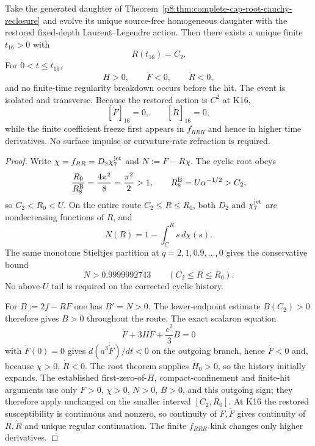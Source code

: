 \documentclass[12pt,a4paper]{article}
\begin{document}
\begin{theorem}
\label{p8:thm:v2111-cyclic-k16-finite-arrival}
Take the generated daughter of
Theorem~\ref{p8:thm:complete-cap-root-cauchy-reclosure} and evolve its unique
source-free homogeneous daughter with the restored fixed-depth Laurent--Legendre
action.  Then there exists a unique finite $t_{16}>0$ with
\[
 \boxed{R(t_{16})=C_2}.
\]
For $0<t\le t_{16}$,
\[
 \boxed{H>0,\qquad \dot F<0,\qquad \dot R<0},
\]
and no finite-time regularity breakdown occurs before the hit.  The event is
isolated and transverse.  Because the restored action is $C^2$ at K16,
\[
 \boxed{[\dot F]_{16}=0,\qquad [\dot R]_{16}=0,}
\]
while the finite coefficient freeze first appears in $f_{RRR}$ and hence in
higher time derivatives.  No surface impulse or curvature-rate refraction is
required.
\end{theorem}
\begin{proof}
Write \(\chi=f_{RR}=D_2\chi_7^{\rm jet}\) and
\(N:=F-R\chi\).  The cyclic root obeys
\[
 \frac{R_0}{R_8^{\rm B}}=\frac{4\pi^2}{8}=\frac{\pi^2}{2}>1,
 \qquad R_8^{\rm B}=U\alpha^{-1/2}>C_2,
\]
so \(C_2<R_0<U\).  On the entire route \(C_2\le R\le R_0\), both \(D_2\) and
\(\chi_7^{\rm jet}\) are nondecreasing functions of \(R\), and
\[
 N(R)=1-\int_C^R s\,d\chi(s).
\]
The same monotone Stieltjes partition at
\(q=2,1,0.9,\ldots,0\) gives the conservative bound
\begin{equation}
\label{p8:eq:v2113-restored-N-bound}
 \boxed{N>0.9999992743\qquad(C_2\le R\le R_0).}
\end{equation}
No above-\(U\) tail is required on the corrected cyclic history.

For \(B:=2f-RF\) one has \(B'=N>0\).  The lower-endpoint estimate
\(B(C_2)>0\) therefore gives \(B>0\) throughout the route.  The exact scalaron
equation
\[
 \ddot F+3H\dot F+\frac{c^2}{3}B=0
\]
with \(\dot F(0)=0\) gives \(d(a^3\dot F)/dt<0\) on the outgoing branch,
hence \(\dot F<0\) and, because \(\chi>0\), \(\dot R<0\).  The root theorem
supplies \(\dot H_0>0\), so the history initially expands.  The established
first-zero-of-\(H\), compact-confinement and finite-hit arguments use only
\(F>0\), \(\chi>0\), \(N>0\), \(B>0\), and this outgoing sign; they therefore
apply unchanged on the smaller interval \([C_2,R_0]\).  At K16 the restored
susceptibility is continuous and nonzero, so continuity of \(F,\dot F\) gives
continuity of \(R,\dot R\) and unique regular continuation.  The finite
\(f_{RRR}\) kink changes only higher derivatives.
\end{proof}
\end{document}
